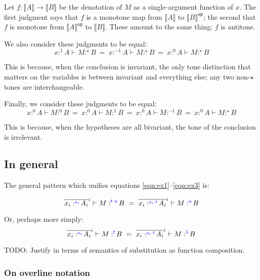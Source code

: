 \documentclass{article}
\newcommand{\todo}[1]{{\color{red}#1}}
\newcommand{\ms}[1]{\ensuremath{\mathsf{#1}}}
\newcommand{\den}[1]{\llbracket{#1}\rrbracket}
\newcommand{\tm}{\ensuremath{1}}     %
\newcommand{\ta}{\ensuremath{{-1}}}    %
\newcommand{\ti}{\ensuremath{\star}} %
\newcommand{\tb}{\ensuremath{0}}     %
\newcommand{\tc}{\cdot}         %
\newcommand{\h}[3]{#1 :^{#3}\! {#2}}
\newcommand{\hm}[2]{\h{#1}{#2}{\tm}}
\newcommand{\ha}[2]{\h{#1}{#2}{\ta}}
\newcommand{\hi}[2]{\h{#1}{#2}{\ti}}
\newcommand{\hb}[2]{\h{#1}{#2}{\tb}}
\begin{document}
Let $f : \den{A} \to \den{B}$ be the denotation of $M$ as a single-argument
function of $x$. The first judgment says that $f$ is a monotone map from
$\den{A}$ to $\den{B}^{\ms{op}}$; the second that $f$ is monotone from
$\den{A}^{\ms{op}}$ to $\den{B}$. These amount to the same thing: $f$ is
antitone.

We also consider these judgments to be equal:
\begin{equation}
  \hm{x}{A} \vdash \hi{M}{B}
  ~=~
  \ha{x}{A} \vdash \hi{M}{B}
  ~=~
  \hb{x}{A} \vdash \hi{M}{B}
\end{equation}

This is because, when the conclusion is invariant, the only tone distinction
that matters on the variables is between invariant and everything else; any two
non-$\ti$ tones are interchangeable.

Finally, we consider these judgments to be equal:
\begin{equation} \label{eqn:ex3}
  \hb{x}{A} \vdash \hb{M}{B}
  ~=~
  \hb{x}{A} \vdash \hm{M}{B}
  ~=~
  \hb{x}{A} \vdash \ha{M}{B}
  ~=~
  \hb{x}{A} \vdash \hi{M}{B}
\end{equation}

This is because, when the hypotheses are all bivariant, the tone of the
conclusion is irrelevant.


\subsection{In general}
The general pattern which unifies equations \ref{eqn:ex1}--\ref{eqn:ex3} is:

\newcommand{\hilited}{\color{blue}}

\begin{equation}
  \overline{\h{x_i}{A_i}{\hilited s_i}}^i \vdash \h{M}{B}{\hilited t \tc u}
  ~=~
  \overline{\h{x_i}{A_i}{\hilited s_i \tc t}}^i
  \vdash \h{M}{B}{\hilited u}
\end{equation}

Or, perhaps more simply:
\begin{equation}
  \overline{\h{x_i}{A_i}{\hilited s_i}}^i \vdash \h{M}{B}{\hilited t}
  ~=~
  \overline{\h{x_i}{A_i}{\hilited s_i \tc t}}^i
  \vdash \h{M}{B}{\hilited\tm}
\end{equation}

\todo{TODO: Justify in terms of semantics of substitution as function
  composition.}

\subsubsection{On overline notation}
\end{document}
